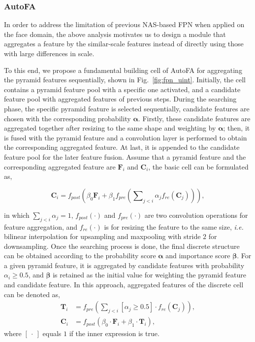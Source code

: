 \documentclass[sigconf]{acmart}
\begin{document}
\subsubsection{AutoFA}
In order to address the limitation of previous NAS-based FPN \cite{wang2019nasfcos, xu2019autofpn,ghiasi2019nasfpn} when applied on the face domain, the above analysis motivates us to design a module that aggregates a feature by the similar-scale features instead of directly using those with large differences in scale.

To this end, we propose a fundamental building cell of AutoFA for aggregating the pyramid features sequentially, shown in Fig.~\ref{fig:fpn_uint}. Initially, the cell contains a pyramid feature pool with a specific one activated, and a candidate feature pool with aggregated features of previous steps. During the searching phase, the specific pyramid feature is selected sequentially, candidate features are chosen with the corresponding probability $\boldsymbol{\alpha}$. Firstly, these candidate features are aggregated together after resizing to the same shape and weighting by $\boldsymbol{\alpha}$; then, it is fused with the pyramid feature and a convolution layer is performed to obtain the corresponding aggregated feature. At last, it is appended to the candidate feature pool for the later feature fusion.
Assume that a pyramid feature and the corresponding aggregated feature are $\mathbf{F}_i$ and $\mathbf{C}_i$, the basic cell can be formulated as,

\begin{equation}
    \mathbf{C}_i = f_{post}\left(\beta_0 \mathbf{F}_i + \beta_1 f_{pre}\left(\sum\nolimits_{j<i}\alpha_j f_{re}(\mathbf{C}_j)\right)\right),
\end{equation}

in which $\sum_{j<i}\alpha_j\!=\!1$, $f_{post}(\cdot)$ and $f_{pre}(\cdot)$ are two convolution operations for feature aggregation, and $f_{re}(\cdot)$ is for resizing the feature to the same size, \textit{i.e.} bilinear interpolation for upsampling and maxpooling with stride $2$ for downsampling. Once the searching process is done, the final discrete structure can be obtained according to the probability score $\boldsymbol{\alpha}$ and importance score $\boldsymbol{\beta}$. For a given pyramid feature, it is aggregated by candidate features with probability $\alpha_i\geq0.5$, and $\boldsymbol{\beta}$ is retained as the initial value for weighting the pyramid feature and candidate feature. In this approach, aggregated features of the discrete cell can be denoted as,
\begin{equation}
\begin{split}
    \mathbf{T}_i &= f_{pre}\left(\sum\nolimits_{j<i}[\alpha_j\geq0.5]\cdot f_{re}(\mathbf{C}_j)\right), \\
    \mathbf{C}_i &= f_{post}\left(\beta_0\cdot\mathbf{F}_i + \beta_1\cdot\mathbf{T}_i\right),
\end{split}
\end{equation}
where $[\!~\cdot~\!]$ equals $1$ if the inner expression is true.
\end{document}

